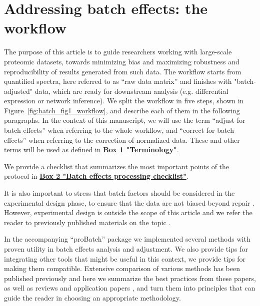 \documentclass[num-refs]{wiley-article}
\begin{document}
\section{Addressing batch effects: the workflow}

The purpose of this article is to guide researchers working with large-scale proteomic datasets, towards minimizing bias and maximizing robustness and reproducibility of results generated from such data. The workflow starts from quantified spectra, here referred to as “raw data matrix” and finishes with "batch-adjusted" data, which are ready for downstream analysis (e.g. differential expression or network inference). We split the workflow in five steps, shown in Figure~\ref{fig:batch_fig1_workflow}, and describe each of them in the following paragraphs. In the context of this manuscript, we will use the term “adjust for batch effects” when referring to the whole workflow, and “correct for batch effects” when referring to the correction of normalized data. These and other terms will be used as defined in \textbf{\hyperref[box:Box1_definitions]{Box 1 "Terminology"}}. 

We provide a checklist that summarizes the most important points of the protocol in \textbf{\hyperref[box:Box2_checklist]{Box 2 "Batch effects processing checklist"}}.

It is also important to stress that batch factors should be considered in the experimental design phase, to ensure that the data are not biased beyond repair  \cite{Hu2005, Gilad2015}. However, experimental design is outside the scope of this article and we refer the reader to previously published materials on the topic \cite{Oberg2009, Cuklina2020}.
 
In the accompanying “proBatch” package we implemented several methods with proven utility in batch effects analysis and adjustment. We also provide tips for integrating other tools that might be useful in this context, we provide tips for making them compatible. Extensive comparison of various methods has been published previously \cite{Chawade:2014aa, Luo2010} and here we summarize the best practices from these papers, as well as reviews \cite{Lazar:2013aa, Leek:2010aa}  and application papers \cite{Sajic2018, Collins2017}, and turn them into principles that can guide the reader in choosing an appropriate methodology. 
\end{document}
